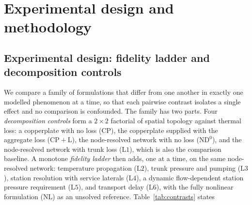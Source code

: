\documentclass[a4paper,fleqn]{cas-dc}
\newcommand{\CP}{\ensuremath{\mathrm{CP}}}      %
\newcommand{\CPL}{\ensuremath{\mathrm{CP{+}L}}} %
\newcommand{\NDz}{\ensuremath{\mathrm{ND^{0}}}} %
\newcommand{\Lone}{\ensuremath{\mathrm{L1}}}    %
\newcommand{\Ltwo}{\ensuremath{\mathrm{L2}}}    %
\newcommand{\Lthree}{\ensuremath{\mathrm{L3}}}  %
\newcommand{\Lfour}{\ensuremath{\mathrm{L4}}}   %
\newcommand{\Lfive}{\ensuremath{\mathrm{L5}}}   %
\newcommand{\Lsix}{\ensuremath{\mathrm{L6}}}    %
\newcommand{\NLref}{\ensuremath{\mathrm{NL}}}   %
\begin{document}
\section{Experimental design and methodology}
\label{sec:methodology}

\subsection{Experimental design: fidelity ladder and decomposition controls}
We compare a family of formulations that differ from one another in exactly one modelled
phenomenon at a time, so that each pairwise contrast isolates a single effect and no
comparison is confounded. The family has two parts. Four \emph{decomposition controls} form a
$2\times2$ factorial of spatial topology against thermal loss: a copperplate with no loss
($\CP$), the copperplate supplied with the aggregate loss ($\CPL$), the node-resolved network
with no loss ($\NDz$), and the node-resolved network with trunk loss ($\Lone$), which is also
the comparison baseline. A monotone \emph{fidelity ladder} then adds, one at a time, on the
same node-resolved network: temperature propagation ($\Ltwo$), trunk pressure and pumping
($\Lthree$), station resolution with service laterals ($\Lfour$), a dynamic flow-dependent
station pressure requirement ($\Lfive$), and transport delay ($\Lsix$), with the fully
nonlinear formulation ($\NLref$) as an unsolved reference. Table~\ref{tab:contrasts} states
\end{document}
